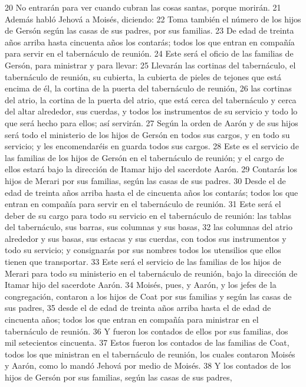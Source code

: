 20 No entrarán para ver cuando cubran las cosas santas, porque morirán.
21 Además habló Jehová a Moisés, diciendo:
22 Toma también el número de los hijos de Gersón según las casas de sus padres, por sus familias.
23 De edad de treinta años arriba hasta cincuenta años los contarás; todos los que entran en compañía para servir en el tabernáculo de reunión.
24 Este será el oficio de las familias de Gersón, para ministrar y para llevar:
25 Llevarán las cortinas del tabernáculo, el tabernáculo de reunión, su cubierta, la cubierta de pieles de tejones que está encima de él, la cortina de la puerta del tabernáculo de reunión, 
26 las cortinas del atrio, la cortina de la puerta del atrio, que está cerca del tabernáculo y cerca del altar alrededor, sus cuerdas, y todos los instrumentos de su servicio y todo lo que será hecho para ellos; así servirán.
27 Según la orden de Aarón y de sus hijos será todo el ministerio de los hijos de Gersón en todos sus cargos, y en todo su servicio; y les encomendaréis en guarda todos sus cargos.
28 Este es el servicio de las familias de los hijos de Gersón en el tabernáculo de reunión; y el cargo de ellos estará bajo la dirección de Itamar hijo del sacerdote Aarón.
29 Contarás los hijos de Merari por sus familias, según las casas de sus padres.
30 Desde el de edad de treinta años arriba hasta el de cincuenta años los contarás; todos los que entran en compañía para servir en el tabernáculo de reunión.
31 Este será el deber de su cargo para todo su servicio en el tabernáculo de reunión: las tablas del tabernáculo, sus barras, sus columnas y sus basas,
32 las columnas del atrio alrededor y sus basas, sus estacas y sus cuerdas, con todos sus instrumentos y todo su servicio; y consignarás por sus nombres todos los utensilios que ellos tienen que transportar.
33 Este será el servicio de las familias de los hijos de Merari para todo su ministerio en el tabernáculo de reunión, bajo la dirección de Itamar hijo del sacerdote Aarón.
34 Moisés, pues, y Aarón, y los jefes de la congregación, contaron a los hijos de Coat por sus familias y según las casas de sus padres,
35 desde el de edad de treinta años arriba hasta el de edad de cincuenta años; todos los que entran en compañía para ministrar en el tabernáculo de reunión.
36 Y fueron los contados de ellos por sus familias, dos mil setecientos cincuenta.
37 Estos fueron los contados de las familias de Coat, todos los que ministran en el tabernáculo de reunión, los cuales contaron Moisés y Aarón, como lo mandó Jehová por medio de Moisés.
38 Y los contados de los hijos de Gersón por sus familias, según las casas de sus padres,
